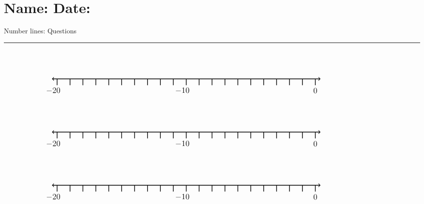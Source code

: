 \documentclass[leqno, 12pt]{article}
\def \HeadingQuestions {\section*{\Large Name: \underline{\hspace{8cm}} \hfill Date: \underline{\hspace{3cm}}} \vspace{-3mm}
{Number lines: Questions} \vspace{1pt}\hrule}
\begin{document}
  \HeadingQuestions
  \vspace{-1mm}
  \begin{equation}
    \begin{tikzpicture}[scale=0.67, baseline={([yshift=-1pt]current bounding box.north)}]
        \draw[{To[scale=1.3]}-{To[scale=1.3]}, line width=1pt] (-20.4, 0) -- (0.4, 0);
        \foreach \x in {-20,-19,...,0}
            \draw[shift={(\x,0)},color=black, line width=1pt] (0pt,-14pt) -- (0pt,0pt);
        \foreach \x in {-20,-10}
            \draw[shift={(\x -0.3,-0.8)},color=black] node[font=\large,text height=12pt] {$\x$};
        \foreach \x in {0}
            \draw[shift={(\x,-0.8)},color=black] node[font=\large,text height=12pt] {$\x$};
        \node [font=\large, anchor=east] at (5,1.65) {$  $};
    \end{tikzpicture}
\end{equation}

\vspace{10pt}\begin{equation}
    \begin{tikzpicture}[scale=0.67, baseline={([yshift=-1pt]current bounding box.north)}]
        \draw[{To[scale=1.3]}-{To[scale=1.3]}, line width=1pt] (-20.4, 0) -- (0.4, 0);
        \foreach \x in {-20,-19,...,0}
            \draw[shift={(\x,0)},color=black, line width=1pt] (0pt,-14pt) -- (0pt,0pt);
        \foreach \x in {-20,-10}
            \draw[shift={(\x -0.3,-0.8)},color=black] node[font=\large,text height=12pt] {$\x$};
        \foreach \x in {0}
            \draw[shift={(\x,-0.8)},color=black] node[font=\large,text height=12pt] {$\x$};
        \node [font=\large, anchor=east] at (5,1.65) {$  $};
    \end{tikzpicture}
\end{equation}

\vspace{10pt}\begin{equation}
    \begin{tikzpicture}[scale=0.67, baseline={([yshift=-1pt]current bounding box.north)}]
        \draw[{To[scale=1.3]}-{To[scale=1.3]}, line width=1pt] (-20.4, 0) -- (0.4, 0);
        \foreach \x in {-20,-19,...,0}
            \draw[shift={(\x,0)},color=black, line width=1pt] (0pt,-14pt) -- (0pt,0pt);
        \foreach \x in {-20,-10}
            \draw[shift={(\x -0.3,-0.8)},color=black] node[font=\large,text height=12pt] {$\x$};
        \foreach \x in {0}
            \draw[shift={(\x,-0.8)},color=black] node[font=\large,text height=12pt] {$\x$};
        \node [font=\large, anchor=east] at (5,1.65) {$  $};
    \end{tikzpicture}
\end{equation}
\end{document}
